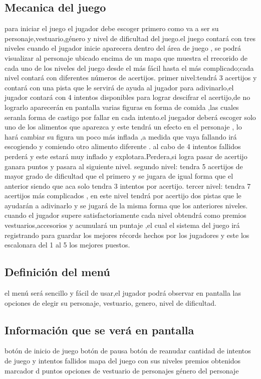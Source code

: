 \documentclass{article}
\begin{document}
\subsection{Mecanica del juego}
%
para iniciar el juego el jugador debe escoger primero como va a ser su personaje,vestuario,género y nivel de dificultad del juego.el juego contará con tres niveles cuando el jugador inicie aparecera dentro del área de juego , se podrá visualizar al personaje ubicado encima de un mapa que muestra el rrecorido de cada uno de los niveles del juego desde el más fácil hasta el más complicado;cada nivel contará con diferentes números de acertijos.
primer nivel:tendrá 3 acertijos y contará con una pista que le servirá de ayuda al jugador para adivinarlo,el jugador contará con 4 intentos disponibles para lograr descifrar el acertijo,de no lograrlo aparecerán en pantalla varias figuras en forma de comida ,las cuales seranla forma de castigo por fallar en cada intento.el juegador deberá escoger solo uno de los alimentos que aparezca y este tendrá un efecto en el personaje , lo hará cambiar su figura un poco más inflada ,a medida que vaya fallando irá escogiendo y comiendo otro alimento diferente . al cabo de 4 intentos fallidos perderá y este estará muy inflado y explotara.Perdera,si logra pasar de acertijo ganara puntos y pasara al siguiente nivel.
segundo nivel: tendra 5 acertijos de mayor grado de dificultad que el primero y se jugara de igual forma que el anterior siendo que aca solo tendra 3 intentos por acertijo.
tercer nivel: tendra 7 acertijos más complicados , en este nivel tendrá por acertijo dos pistas que le ayudarán a adivinarlo y se jugará de la misma forma que los anteriores niveles.
cuando el jugador supere satisfactoriamente cada nivel obtendrá como premios vestuarios,accesorios y acumulará un puntaje ,el cual el sistema del juego irá registrando para guardar los mejores récords hechos por los jugadores y este los escalonara del 1 al 5 los mejores puestos.

\subsection{Definición del menú}
%
el menú será sencillo y fácil de usar,el jugador podrá observar en pantalla las opciones de elegir su personaje, vestuario, genero, nivel de dificultad.

\subsection{Información que se verá en pantalla}
%
botón de inicio de juego
botón de pausa
botón de reanudar
cantidad de intentos de juego y intentos fallidos
mapa del juego con sus niveles
premios obtenidos
marcador d puntos
opciones de vestuario de personajes
género del personaje
\end{document}
